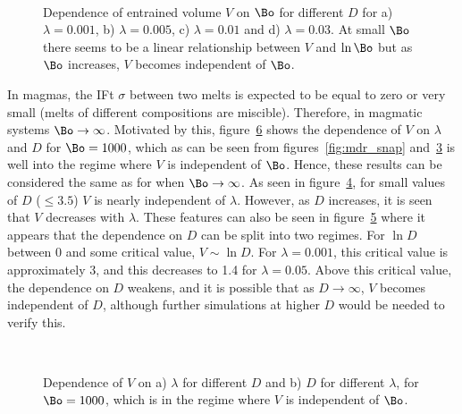 {\begin{figure}
      \begin{subfigure}[b]{0.45\textwidth}
        \resizebox{\textwidth}{!}{\Large }
        \caption{}
        \label{fig:viscos_rat=0.01}
      \end{subfigure}
      ~
      \begin{subfigure}[b]{0.45\textwidth}
        \resizebox{\textwidth}{!}{\Large }
        \caption{}
        \label{fig:mdr=viscos_rat=0.03}
      \end{subfigure}
      \caption{Dependence of entrained volume $V$ on $\Bo$ for different $D$ for a) $\lambda = 0.001$, b) $\lambda = 0.005$, c) $\lambda = 0.01$ and d) $\lambda = 0.03$. At small $\Bo$ there seems to be a linear relationship between $V$ and $\ln\Bo$ but as $\Bo$ increases, $V$ becomes independent of $\Bo$. }\label{fig:viscos_snap}
    \end{figure}

In magmas, the IFt $\sigma$ between two melts is expected to be equal to zero or very small (melts of different compositions are miscible). Therefore, in magmatic systems $\Bo \to \infty$. Motivated by this, figure~\ref{fig:highBo} shows the dependence of $V$ on $\lambda$ and $D$ for $\Bo = 1000$, which as can be seen from figures~\ref{fig:mdr_snap} and~\ref{fig:viscos_snap} is well into the regime where $V$ is independent of $\Bo$. Hence, these results can be considered the same as for when $\Bo \to \infty$. As seen in figure~\ref{fig:highBo_viscos}, for small values of $D$ ($\leq 3.5$) $V$ is nearly independent of $\lambda$. However, as $D$ increases, it is seen that $V$ decreases with $\lambda$. These features can also be seen in figure~\ref{fig:highBo_mdr} where it appears that the dependence on $D$ can be split into two regimes. For $\ln D$ between 0 and some critical value, $V \sim \ln D$. For $\lambda = 0.001$, this critical value is approximately 3, and this decreases to 1.4 for $\lambda = 0.05$. Above this critical value, the dependence on $D$ weakens, and it is possible that as $D \to \infty$, $V$ becomes independent of $D$, although further simulations at higher $D$ would be needed to verify this.

    \begin{figure}
      \centering
      \begin{subfigure}[b]{0.45\textwidth}
        \resizebox{\textwidth}{!}{\Large }
        \caption{}
        \label{fig:highBo_viscos}
      \end{subfigure}
      ~
      \begin{subfigure}[b]{0.45\textwidth}
        \resizebox{\textwidth}{!}{\Large }
        \caption{}
        \label{fig:highBo_mdr}
      \end{subfigure}
      \caption{Dependence of $V$ on a) $\lambda$ for different $D$ and b) $D$ for different $\lambda$, for $\Bo = 1000$, which is in the regime where $V$ is independent of $\Bo$.}\label{fig:highBo}
    \end{figure}

}
